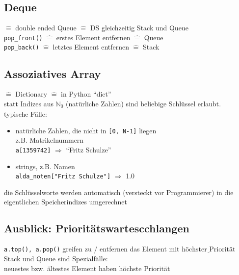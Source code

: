         \subsection{Deque}
        $\widehat{=}$ double ended Queue $\widehat{=}$ DS gleichzeitig Stack und Queue \\

        \verb|pop_front()| $\widehat{=}$ erstes Element entfernen $\widehat{=}$ Queue \\
        \verb|pop_back()| $\widehat{=}$ letztes Element entfernen $\widehat{=}$ Stack \\

        \subsection{Assoziatives Array}
        $\widehat{=}$ Dictionary $\widehat{=}$ in Python ``dict'' \\

        statt Indizes aus $\mathbb{N}_{0}$ (natürliche Zahlen) sind $\underline{\text{beliebige}}$ Schlüssel erlaubt. \\

        typische Fälle:
        \begin{itemize}[label={-}]
            \item natürliche Zahlen, die nicht in \verb|[0, N-1]| liegen \\
            z.B. Matrikelnummern \\
            \verb|a[1359742]| $\Rightarrow$ ``Fritz Schulze''
            \item strings, z.B. Namen \\
            \verb|alda_noten["Fritz Schulze"]| $\Rightarrow$ 1.0
        \end{itemize}
        die Schlüsselworte werden automatisch (versteckt vor Programmierer) in die eigentlichen Speicherindizes umgerechnet \\

        \subsection[Prioritätswartescchlangen]{Ausblick: Prioritätswartescchlangen}
        \verb|a.top(), a.pop()| greifen zu / entfernen das Element mit $\underline{\text{höchster Priorität}}$\\

        Stack und Queue sind Spezialfälle: \\
        neuestes bzw. ältestes Element haben höchste Priorität \\


